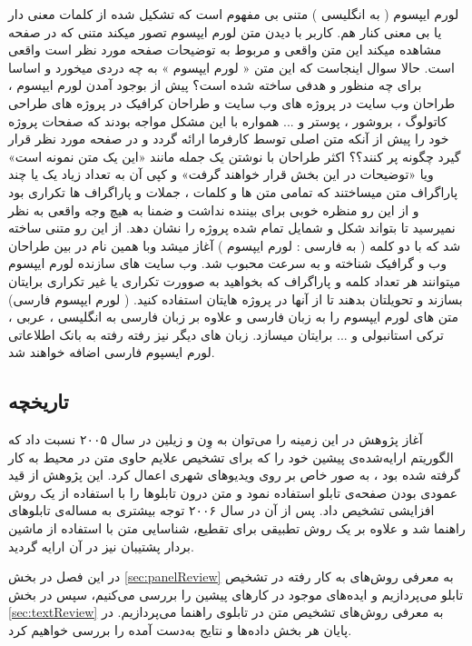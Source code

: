 \documentclass[oneside,openany,msc]{SBU-Thesis}
\begin{document}
	لورم ایپسوم ( به انگلیسی  ) متنی بی مفهوم است که تشکیل شده از کلمات معنی دار یا بی معنی کنار هم. کاربر با دیدن متن لورم ایپسوم تصور میکند متنی که در صفحه مشاهده میکند این متن واقعی و مربوط به توضیحات صفحه مورد نظر است واقعی است. حالا سوال اینجاست که این متن « لورم ایپسوم » به چه دردی میخورد و اساسا برای چه منظور و هدفی ساخته شده است؟ پیش از بوجود آمدن لورم ایپسوم ، طراحان وب سایت در پروژه های وب سایت و طراحان کرافیک در پروژه های طراحی کاتولوگ ، بروشور ، پوستر و ... همواره با این مشکل مواجه بودند که صفحات پروژه خود را پیش از آنکه متن اصلی توسط کارفرما ارائه گردد و در صفحه مورد نظر قرار گیرد چگونه پر کنند؟؟ اکثر طراحان با نوشتن یک جمله مانند «این یک متن نمونه است» ویا «توضیحات در این بخش قرار خواهند گرفت» و کپی آن به تعداد زیاد یک یا چند پاراگراف متن میساختند که تمامی متن ها و کلمات ، جملات و پاراگراف ها تکراری بود و از این رو منظره خوبی برای بیننده نداشت و ضمنا به هیچ وجه واقعی به نظر نمیرسید تا بتواند شکل و شمایل تمام شده پروژه را نشان دهد. از این رو متنی ساخته شد که با دو کلمه ( به فارسی : لورم ایپسوم ) آغاز میشد وبا همین نام در بین طراحان وب و گرافیک شناخته و به سرعت محبوب شد. وب سایت های سازنده لورم ایپسوم میتوانند هر تعداد کلمه و پاراگراف که بخواهید به صوورت تکراری یا غیر تکراری برایتان بسازند و تحویلتان بدهند تا از آنها در پروژه هایتان استفاده کنید. ( لورم ایپسوم فارسی) متن های لورم ایپسوم را به زبان فارسی و علاوه بر زبان فارسی به انگلیسی ، عربی ، ترکی استانبولی و ... برایتان میسازد. زبان های دیگر نیز رفته رفته به بانک اطلاعاتی لورم ایسپوم فارسی اضافه خواهند شد.  
	
	\subsection{تاریخچه}
	
	آغاز پژوهش در این زمینه را می‌توان به وِن و زیلین \cite{Wu2005} 
	در سال ۲۰۰۵ نسبت داد که الگوریتم ارایه‌شده‌ی پیشین خود را که برای تشخیص علایم حاوی متن در محیط به‌ کار گرفته‌ شده بود \cite{Chen2004}، به صور خاص بر روی ویدیوهای شهری اعمال کرد. این پژوهش از قید عمودی بودن صفحه‌ی تابلو استفاده نمود و متن درون تابلوها را با استفاده از یک روش افزایشی تشخیص داد. پس از آن در سال ۲۰۰۶ توجه بیشتری به مساله‌ی تابلوهای راهنما شد \cite{reina2006adaptive, vazquez2006approach} و علاوه بر یک روش تطبیقی برای تقطیع، شناسایی متن با استفاده از ماشین بردار پشتیبان
	نیز در آن ارایه گردید. 
	
	
	در این فصل در بخش \ref{sec:panelReview} به معرفی روش‌های به کار رفته در تشخیص تابلو می‌پردازیم و ایده‌های موجود در کارهای پیشین را بررسی می‌کنیم، سپس در بخش \ref{sec:textReview} به معرفی روش‌های تشخیص متن در تابلوی راهنما می‌پردازیم. در پایان هر بخش داده‌ها و نتایج به‌دست آمده را بررسی خواهیم کرد. 
	
\end{document}
